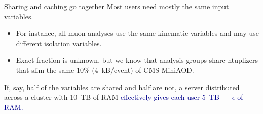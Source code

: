 \documentclass{beamer}
\begin{document}
\begin{frame}{\underline{Sharing} and \underline{caching} go together}
\vspace{0.25 cm}
Most users need mostly the same input variables.
\begin{itemize}
\item For instance, all muon analyses use the same kinematic variables and may use different isolation variables.
\item Exact fraction is unknown, but we know that analysis groups share ntuplizers that slim the same 10\% (4~kB/event) of CMS MiniAOD.
\end{itemize}









\vspace{0.5 cm}
If, say, half of the variables are shared and half are not, a server distributed across a cluster with 10~TB of RAM \textcolor{darkblue}{effectively gives each user 5~TB~$+$~$\epsilon$ of RAM.}
\end{frame}
\end{document}
